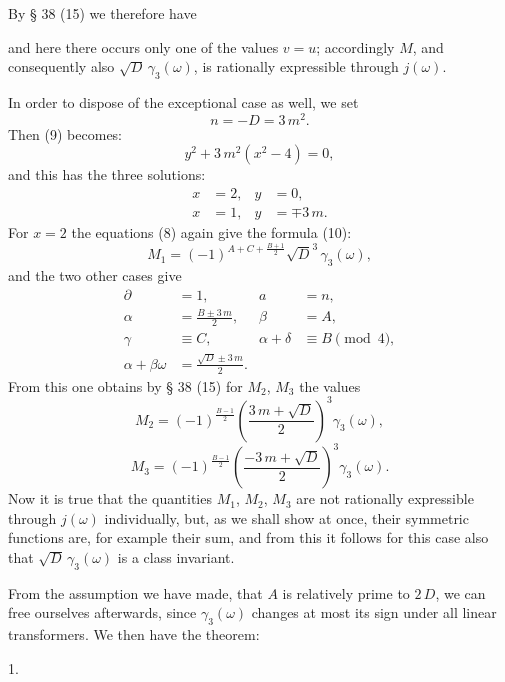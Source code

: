 
By § 38 (15) we therefore have

and here there occurs only one of the values $v = u$; accordingly $M$,
and consequently also $\sqrt{D}\,\gamma_3(\omega)$, is rationally expressible through $j(\omega)$.

In order to dispose of the exceptional case as well, we set
\[
n = -D = 3\,m^2.
\]
Then (9) becomes:
\[
y^2 + 3\,m^2(x^2 - 4) = 0,
\]
and this has the three solutions:
\[
\begin{aligned}
x &= 2, & y &= 0, \\
x &= 1, & y &= \mp 3\,m.
\end{aligned}
\]
For $x = 2$ the equations (8) again give the formula (10):
\[
M_1 = (-1)^{A + C + \frac{B+1}{2}} \sqrt{D}^3\, \gamma_3(\omega),
\]
and the two other cases give
\[
\begin{aligned}
\partial &= 1, & a &= n, \\
\alpha &= \frac{B \pm 3\,m}{2}, & \beta &= A, \\
\gamma &\equiv C, & \alpha + \delta &\equiv B \pmod{4}, \\
\alpha + \beta\omega &= \frac{\sqrt{D} \pm 3\,m}{2}. &&
\end{aligned}
\]
From this one obtains by § 38 (15) for $M_2$, $M_3$ the values
\[
M_2 = (-1)^{\frac{B-1}{2}} \left(\frac{3\,m + \sqrt{D}}{2}\right)^3 \gamma_3(\omega),
\]
\[
M_3 = (-1)^{\frac{B-1}{2}} \left(\frac{-3\,m + \sqrt{D}}{2}\right)^3 \gamma_3(\omega).
\]
Now it is true that the quantities $M_1$, $M_2$, $M_3$ are not rationally
expressible through $j(\omega)$ individually, but, as we shall show at once, their symmetric functions are, for example their sum, and
from this it follows for this case also that $\sqrt{D}\,\gamma_3(\omega)$ is a class invariant.

From the assumption we have made, that $A$ is relatively
prime to $2\,D$, we can free ourselves afterwards, since $\gamma_3(\omega)$
changes at most its sign under all linear transformers.
We then have the theorem:

1. 
